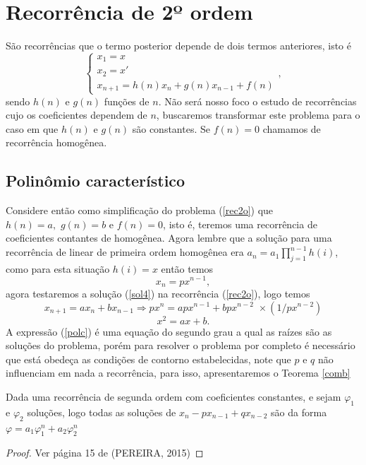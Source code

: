 \section{Recorrência de 2º ordem} 	  
\quad São recorrências que o termo posterior depende de dois termos anteriores, isto é
\begin{equation}
\label{rec2o}
\begin{cases}
x_1 = x\\
x_2 = x'\\
x_{n+1} = h(n)x_{n} + g(n) x_{n-1} + f(n)
\end{cases},
\end{equation}
sendo $h(n)$ e $g(n)$ funções de $n$. Não será nosso foco o estudo de recorrências cujo os coeficientes dependem de $n$, buscaremos transformar este problema para o caso em que $h(n)$ e $g(n)$ são constantes. Se $f(n) = 0$ chamamos de recorrência homogênea.

\subsection{Polinômio característico}
    \inic Considere então como simplificação do problema (\ref{rec2o}) que $h(n) = a,\,\,g(n)=b$ e $f(n)=0$, isto é, teremos uma recorrência de coeficientes contantes de homogênea. Agora lembre que a solução para uma recorrência de linear de primeira ordem homogênea era $\displaystyle a_{n}=a_1\prod_{j=1}^{n-1}h(i)$, como para esta situação $h(i) = x$ então temos
    \begin{equation}
    \label{sol4}
        x_n = px^{n-1},
    \end{equation}
    agora testaremos a solução (\ref{sol4}) na recorrência (\ref{rec2o}), logo temos
    $$
    x_{n+1} = ax_{n} + bx_{n-1} \Rightarrow px^{n} = apx^{n-1} + bpx^{n-2}\,\,\times (1/px^{n-2})
    $$
    \begin{equation}
    \label{polc}
        x^2 = ax + b.
    \end{equation}
    \quad A expressão (\ref{polc}) é uma equação do segundo grau a qual as raízes são as soluções do problema, porém para resolver o problema por completo é necessário que está obedeça as condições de contorno estabelecidas, note que $p$ e $q$ não influenciam em nada a recorrência, para isso, apresentaremos o Teorema \ref{comb}
    \begin{teo}
    \label{comb}
    Dada uma recorrência de segunda ordem com coeficientes constantes, e sejam $\varphi_1$ e $\varphi_2$ soluções, logo todas as soluções de $x_n -px_{n-1} + qx_{n-2}$ são da forma  
    $\varphi = a_1\varphi_1^n + a_2\varphi_2^n$
    \end{teo}
    \begin{proof}
    Ver página 15 de (PEREIRA, 2015)
    \end{proof}
\begin{example}
\end{example}
 

